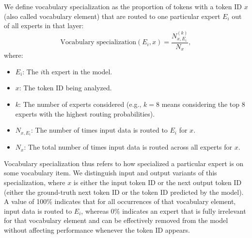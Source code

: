 \documentclass{article}
\begin{document}
We define vocabulary specialization as the proportion of tokens with a token ID $x$ (also called vocabulary element) that are routed to one particular expert $E_i$ out of all experts in that layer:
\begin{equation}
\label{eq:token}
\text{Vocabulary specialization}(E_i, x) = \frac{N_{x, E_i}^{(k)}}{N_x},
\end{equation}
where:
\begin{itemize}
\item $E_i$: The $i$th expert in the model.
\item $x$: The token ID being analyzed.
\item $k$: The number of experts considered (e.g., $k=8$ means considering the top 8 experts with the highest routing probabilities).    
\item $N_{x, E_i}$: The number of times input data is routed to $E_i$ for $x$.
\item $N_x$: The total number of times input data is routed across all experts for  $x$.
\end{itemize}
Vocabulary specialization thus refers to how specialized a particular expert is on some vocabulary item. We distinguish input and output variants of this specialization, where $x$ is either the input token ID or the next output token ID (either the ground-truth next token ID or the token ID predicted by the model). A value of 100\% indicates that for all occurrences of that vocabulary element, input data is routed to $E_i$, whereas 0\% indicates an expert that is fully irrelevant for that vocabulary element and can be effectively removed from the model without affecting performance whenever the token ID appears.
\end{document}
